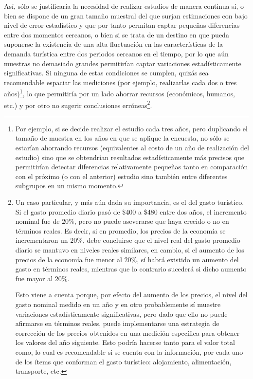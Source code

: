 \documentclass[
]{book}
\begin{document}
Así, sólo se justificaría la necesidad de realizar estudios de manera continua sí, o bien se dispone de un gran tamaño muestral del que surjan estimaciones con bajo nivel de error estadístico y que por tanto permitan captar pequeñas diferencias entre dos momentos cercanos, o bien si se trata de un destino en que pueda suponerse la existencia de una alta fluctuación en las características de la demanda turística entre dos periodos cercanos en el tiempo, por lo que aún muestras no demasiado grandes permitirían captar variaciones estadísticamente significativas. Si ninguna de estas condiciones se cumplen, quizás sea recomendable espaciar las mediciones (por ejemplo, realizarlas cada dos o tres años)\footnote{Por ejemplo, si se decide realizar el estudio cada tres años, pero duplicando el tamaño de muestra en los años en que se aplique la encuesta, no sólo se estarían ahorrando recursos (equivalentes al costo de un año de realización del estudio) sino que se obtendrían resultados estadísticamente más precisos que permitirían detectar diferencias relativamente pequeñas tanto en comparación con el próximo (o con el anterior) estudio sino también entre diferentes subgrupos en un mismo momento.}, lo que permitiría por un lado ahorrar recursos (económicos, humanos, etc.) y por otro no sugerir conclusiones erróneas\footnote{Un caso particular, y más aún dada su importancia, es el del gasto turístico. Si el gasto promedio diario pasó de \$400 a \$480 entre dos años, el incremento nominal fue de \(20\%\), pero no puede aseverarse que haya crecido o no en términos reales. Es decir, si en promedio, los precios de la economía se incrementaron un \(20\%\), debe concluirse que el nivel real del gasto promedio diario se mantuvo en niveles reales similares, en cambio, si el aumento de los precios de la economía fue menor al \(20\%\), sí habrá existido un aumento del gasto en términos reales, mientras que lo contrario sucederá si dicho aumento fue mayor al \(20\%\).

  Esto viene a cuenta porque, por efecto del aumento de los precios, el nivel del gasto nominal medido en un año y en otro probablemente sí muestre variaciones estadísticamente significativas, pero dado que ello no puede afirmarse en términos reales, puede implementarse una estrategia de corrección de los precios obtenidos en una medición específica para obtener los valores del año siguiente. Esto podría hacerse tanto para el valor total como, lo cual es recomendable si se cuenta con la información, por cada uno de los ítems que conforman el gasto turístico: alojamiento, alimentación, transporte, etc.}.
\end{document}
